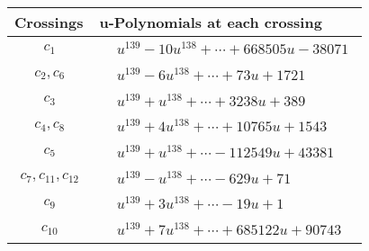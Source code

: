 \documentclass[1p]{elsarticle_modified}
\theoremstyle{definition}
\begin{document}
\begin{tabular}{m{50pt}|m{274pt}}
Crossings & \hspace{64pt}u-Polynomials at each crossing \\
\hline $$\begin{aligned}c_{1}\end{aligned}$$&$\begin{aligned}
&u^{139}-10 u^{138}+\cdots+668505 u-38071
\end{aligned}$\\
\hline $$\begin{aligned}c_{2},c_{6}\end{aligned}$$&$\begin{aligned}
&u^{139}-6 u^{138}+\cdots+73 u+1721
\end{aligned}$\\
\hline $$\begin{aligned}c_{3}\end{aligned}$$&$\begin{aligned}
&u^{139}+u^{138}+\cdots+3238 u+389
\end{aligned}$\\
\hline $$\begin{aligned}c_{4},c_{8}\end{aligned}$$&$\begin{aligned}
&u^{139}+4 u^{138}+\cdots+10765 u+1543
\end{aligned}$\\
\hline $$\begin{aligned}c_{5}\end{aligned}$$&$\begin{aligned}
&u^{139}+u^{138}+\cdots-112549 u+43381
\end{aligned}$\\
\hline $$\begin{aligned}c_{7},c_{11},c_{12}\end{aligned}$$&$\begin{aligned}
&u^{139}- u^{138}+\cdots-629 u+71
\end{aligned}$\\
\hline $$\begin{aligned}c_{9}\end{aligned}$$&$\begin{aligned}
&u^{139}+3 u^{138}+\cdots-19 u+1
\end{aligned}$\\
\hline $$\begin{aligned}c_{10}\end{aligned}$$&$\begin{aligned}
&u^{139}+7 u^{138}+\cdots+685122 u+90743
\end{aligned}$\\
\hline
\end{tabular}\\~\\
\end{document}
